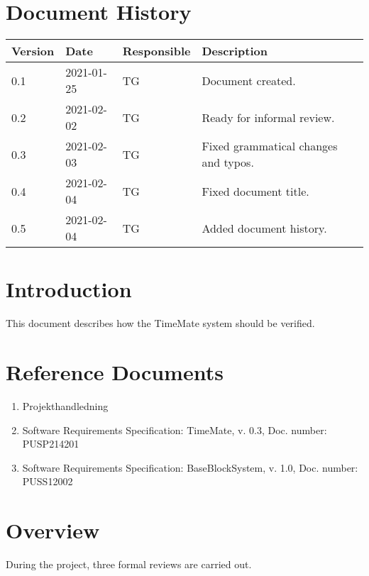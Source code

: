 \documentclass{article}
\date {#1}
\title {
    \documentNumber {02}    
    
    \documentVersion {0.2}
    
    \documentTitle {Software Verification and Validation Specification}
    \documentGroup {2}
    
    \documentResponsible {Test Group}
    \documentAuthors {Test Group}
    
    \documentDate {2021-02-04}
}
\begin{document}
\maketitle
\thispagestyle{empty}

\newpage

\tableofcontents

\newpage



\section{Document History}
\begin{tabular}{ l | l | l | l }
    Version & Date & Responsible & Description \\
    \hline
    0.1 & 2021-01-25 & TG & Document created. \\
    0.2 & 2021-02-02 & TG & Ready for informal review. \\
    0.3 & 2021-02-03 & TG & Fixed grammatical changes and typos. \\
    0.4 & 2021-02-04 & TG & Fixed document title. \\
    0.5 & 2021-02-04 & TG & Added document history. \\
\end{tabular}

\section{Introduction}

	This document describes how the TimeMate system should be verified. 

\section{Reference Documents}

\begin{enumerate}
  \item Projekthandledning 
  \item Software Requirements Specification: TimeMate, v. 0.3, Doc. number: PUSP214201
  \item Software Requirements Specification: BaseBlockSystem, v. 1.0, Doc. number: PUSS12002

\end{enumerate}

\section{Overview}
During the project, three formal reviews are carried out.
\end{document}
